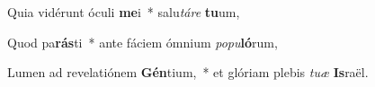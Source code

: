 \item Quia vidérunt óculi \textbf{me}i~* salu\textit{tá}\textit{re} \textbf{tu}um,
\item Quod pa\textbf{rás}ti~* ante fáciem ómnium \textit{po}\textit{pu}\textbf{ló}rum,
\item Lumen ad revelatiónem \textbf{Gén}tium,~* et glóriam plebis \textit{tu}\textit{æ} \textbf{Is}raël.
